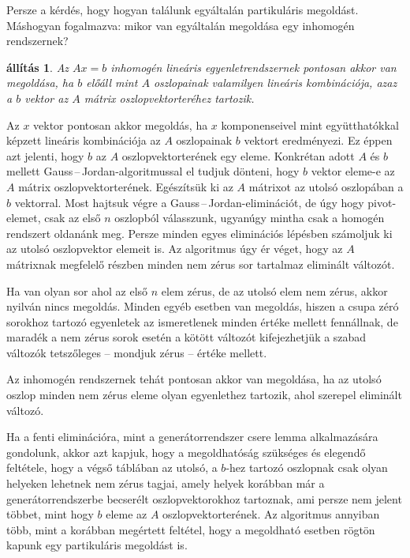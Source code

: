 \documentclass[a4paper, showtrims]{memoir}
\makeatletter
\renewenvironment{proof}[1][\proofname]
    {\par\pushQED{\qed}%
    \normalfont \topsep6\p@\@plus6\p@\relax
    \trivlist
    \item[\hskip\labelsep
        \itshape
    #1\@addpunct{:}]\ignorespaces}
    {\popQED\endtrivlist\@endpefalse}
\theoremstyle{plain}
\newtheorem{proposition}{állítás}[chapter]
\theoremstyle{remark}
\theoremstyle{definition}
\makeatother
\begin{document}
Persze a kérdés, hogy hogyan találunk egyáltalán partikuláris megoldást.
Máshogyan fogalmazva: mikor van egyáltalán megoldása egy inhomogén rendszernek?
\begin{proposition}
	Az $Ax=b$ inhomogén lineáris egyenletrendszernek pontosan akkor van megoldása,
	ha $b$ előáll mint $A$ oszlopainak valamilyen lineáris kombinációja,
	azaz a $b$ vektor az $A$ mátrix oszlopvektorteréhez tartozik.
\end{proposition}
\begin{proof}
    Az $x$ vektor pontosan akkor megoldás,
    ha $x$ komponenseivel mint együtthatókkal képzett lineáris kombinációja az $A$ oszlopainak $b$ vektort
    eredményezi. Ez éppen azt jelenti, hogy $b$ az $A$ oszlopvektorterének egy eleme.
\end{proof}
Konkrétan adott $A$ és $b$ mellett Gauss\,--\,Jordan-algoritmussal  el tudjuk dönteni, hogy
$b$ vektor eleme-e az $A$ mátrix oszlopvektorterének.
Egészítsük ki az $A$ mátrixot az utolsó oszlopában a $b$ vektorral.
Most hajtsuk végre a Gauss\,--\,Jordan-eliminációt, de úgy hogy pivot-elemet,
csak az első $n$ oszlopból válasszunk, ugyanúgy mintha csak a homogén rendszert oldanánk meg.
Persze minden egyes eliminációs lépésben számoljuk ki az utolsó oszlopvektor elemeit is.
Az algoritmus úgy ér véget,
hogy az $A$ mátrixnak megfelelő részben minden nem zérus sor tartalmaz eliminált változót.

Ha van olyan sor ahol az első $n$ elem zérus, de az utolsó elem nem zérus,
akkor nyilván nincs megoldás.
Minden egyéb esetben van megoldás,
hiszen a csupa zéró sorokhoz tartozó egyenletek az ismeretlenek minden értéke mellett fennállnak,
de maradék a nem zérus sorok esetén a kötött változót
kifejezhetjük a szabad változók tetszőleges -- mondjuk zérus -- értéke mellett.

Az inhomogén rendszernek tehát pontosan akkor van megoldása,
ha az utolsó oszlop minden nem zérus eleme olyan egyenlethez tartozik,
ahol szerepel eliminált változó.

Ha a fenti eliminációra, mint a generátorrendszer csere lemma alkalmazására gondolunk,
akkor azt kapjuk, hogy a megoldhatóság szükséges és elegendő feltétele,
hogy a végső táblában az utolsó, a $b$-hez tartozó oszlopnak csak olyan helyeken lehetnek nem zérus tagjai,
amely helyek korábban már a generátorrendszerbe becserélt oszlopvektorokhoz tartoznak,
ami persze nem jelent többet, mint hogy $b$ eleme az $A$ oszlopvektorterének.
Az algoritmus annyiban több, mint a korábban megértett feltétel,
hogy a megoldható esetben rögtön kapunk egy partikuláris megoldást is.
\end{document}
